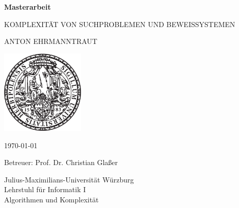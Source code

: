 \pagestyle{empty}

\begin{center}{

\vfill\sffamily

{\Large\textbf{Masterarbeit}}\par
    \vspace*{1cm}
{\huge\textsc{KOMPLEXITÄT VON SUCHPROBLEMEN UND BEWEISSYSTEMEN}}\par
    \vspace*{.3cm}
{\Large\textsc{ANTON EHRMANNTRAUT}}\par}
\vspace*{5cm}

\includegraphics[width=4cm]{siegel.pdf}

\vspace*{2cm}


{\large\sffamily\today}\vspace*{.7cm}

{\large\sffamily Betreuer: Prof. Dr. Christian Glaßer}\vspace*{.5cm}


{\large\sffamily
Julius-Maximilians-Universität Würzburg\\
Lehrstuhl für Informatik I\\
Algorithmen und Komplexität
}


\end{center}

\cleardoublepage
\restoregeometry

\tableofcontents
\thispagestyle{empty}
\cleardoublepage
{}
\pagestyle{main}

